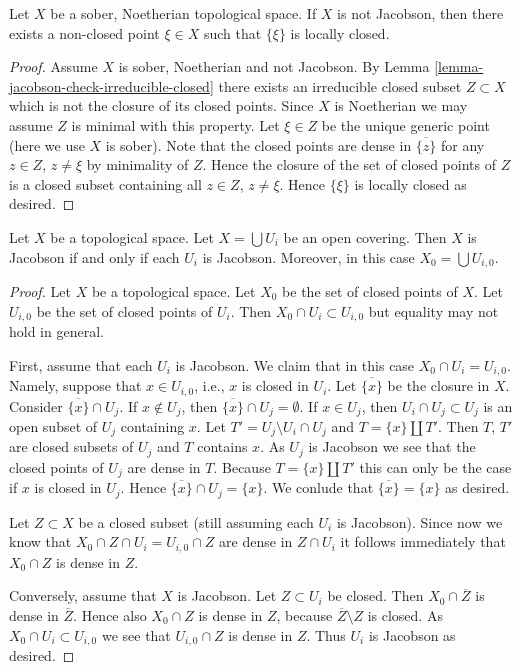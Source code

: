 \begin{lemma}
\label{lemma-non-jacobson-Noetherian-characterize}
Let $X$ be a sober, Noetherian topological space.
If $X$ is not Jacobson, then there exists a non-closed point
$\xi \in X$ such that $\{\xi\}$ is locally closed.
\end{lemma}

\begin{proof}
Assume $X$ is sober, Noetherian and not Jacobson.
By Lemma \ref{lemma-jacobson-check-irreducible-closed} there exists
an irreducible closed subset $Z \subset X$ which is not the closure
of its closed points. Since $X$ is Noetherian we may assume $Z$ is
minimal with this property. Let $\xi \in Z$ be the unique generic point
(here we use $X$ is sober). Note that the closed points are dense in
$\overline{\{z\}}$ for any $z \in Z$, $z \not = \xi$ by minimality
of $Z$. Hence the closure of the set of closed points of $Z$ is
a closed subset containing all $z \in Z$, $z \not = \xi$. Hence
$\{\xi\}$ is locally closed as desired.
\end{proof}

\begin{lemma}
\label{lemma-jacobson-local}
Let $X$ be a topological space.
Let $X = \bigcup U_i$ be an open covering.
Then $X$ is Jacobson if and only if each $U_i$ is Jacobson.
Moreover, in this case $X_0 = \bigcup U_{i, 0}$.
\end{lemma}

\begin{proof}
Let $X$ be a topological space.
Let $X_0$ be the set of closed points of $X$.
Let $U_{i, 0}$ be the set of closed points of
$U_i$. Then $X_0 \cap U_i \subset U_{i, 0}$
but equality may not hold in general.

\medskip\noindent
First, assume that each $U_i$ is Jacobson.
We claim that in this case $X_0 \cap U_i = U_{i, 0}$.
Namely, suppose that $x \in U_{i, 0}$, i.e., $x$ is closed in
$U_i$. Let $\overline{\{x\}}$ be the closure
in $X$. Consider $\overline{\{x\}} \cap U_j$.
If $x \not \in U_j$, then $\overline{\{x\}} \cap U_j = \emptyset$.
If $x \in U_j$, then $U_i \cap U_j \subset U_j$
is an open subset of $U_j$ containing $x$.
Let $T' = U_j \setminus U_i \cap U_j$ and
$T = \{x\} \coprod T'$. Then $T$, $T'$
are closed subsets of $U_j$ and $T$ contains
$x$. As $U_j$ is Jacobson we see that the closed points of
$U_j$ are dense in $T$. Because $T = \{x\} \coprod T'$
this can only be the case if $x$ is closed in $U_j$.
Hence $\overline{\{x\}} \cap U_j = \{x\}$. We conlude
that $\overline{\{x\}} = \{ x \}$ as desired.

\medskip\noindent
Let $Z \subset X$ be a closed subset (still
assuming each $U_i$ is Jacobson).
Since now we know that $X_0 \cap Z  \cap U_i
= U_{i, 0} \cap Z$ are dense in $Z \cap U_i$
it follows immediately that $X_0 \cap Z$ is
dense in $Z$.

\medskip\noindent
Conversely, assume that $X$ is Jacobson.
Let $Z \subset U_i$ be closed. Then
$X_0 \cap \overline{Z}$ is dense in $\overline{Z}$.
Hence also $X_0 \cap Z$ is dense in $Z$, because
$\overline{Z} \setminus Z$ is closed. As $X_0 \cap U_i
\subset U_{i, 0}$ we see that
$U_{i, 0} \cap Z$ is dense in $Z$.
Thus $U_i$ is Jacobson as desired.
\end{proof}

